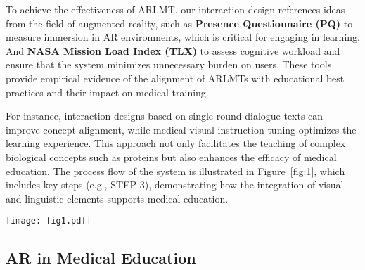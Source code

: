 \documentclass[10pt,letterpaper]{article}
\begin{document}
To achieve the effectiveness of ARLMT, our interaction design references ideas from the field of augmented reality, such as \textbf{Presence Questionnaire (PQ)}\cite{witmer1998measuring} to measure immersion in AR environments, which is critical for engaging in learning. And \textbf{NASA Mission Load Index (TLX)}\cite{hart1988development} to assess cognitive workload and ensure that the system minimizes unnecessary burden on users. These tools provide empirical evidence of the alignment of ARLMTs with educational best practices and their impact on medical training.

For instance, interaction designs based on single-round dialogue texts can improve concept alignment, while medical visual instruction tuning optimizes the learning experience. This approach not only facilitates the teaching of complex biological concepts such as proteins but also enhances the efficacy of medical education. The process flow of the system is illustrated in Figure~\ref{fig:1}, which includes key steps (e.g., STEP 3), demonstrating how the integration of visual and linguistic elements supports medical education.

\begin{figure*}[t] %
    \centering
    \texttt{[image: fig1.pdf]} %
    \caption{{\bf Full flow chart.}
    This illustration illustrates a three-step process for developing a medical education-related model for AR deployment. In step 1, a single round of dialogue text from PMC, GQA and other sources is used for pre-training to enhance consistency in medical concepts. The step 2 involves multi-round conversation image-text pairs for medical vision teaching optimization based on QLoRA. Finally, in step 3, the LLamacpp model is quantified and deployed on AR to integrate the previous work for practical medical teaching scenarios.}
    \label{fig:1}
\end{figure*}



\subsection*{AR in Medical Education}
\end{document}
